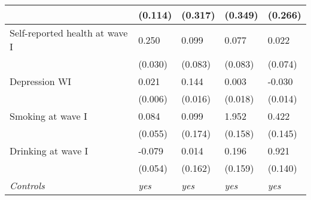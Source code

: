\documentclass[xcolor=dvipsnames]{beamer}
\begin{document}
{\begin{center}
\begin{tiny}
\begin{tabular}{lllll}
                 &     (0.114)         &     (0.317)         &     (0.349)         &     (0.266)         \\
\midrule  
Self-reported health at wave I&       0.250\sym{***}&       0.099         &       0.077         &       0.022         \\
                    &     (0.030)         &     (0.083)         &     (0.083)         &     (0.074)         \\
\addlinespace
Depression WI       &       0.021\sym{***}&       0.144\sym{***}&       0.003         &      -0.030\sym{*}  \\
                    &     (0.006)         &     (0.016)         &     (0.018)         &     (0.014)         \\
\addlinespace
Smoking at wave I   &       0.084         &       0.099         &       1.952\sym{***}&       0.422\sym{**} \\
                    &     (0.055)         &     (0.174)         &     (0.158)         &     (0.145)         \\
\addlinespace
Drinking at wave I  &      -0.079         &       0.014         &       0.196         &       0.921\sym{***}\\
                    &     (0.054)         &     (0.162)         &     (0.159)         &     (0.140)         \\
\emph{Controls}            &  \emph{yes}     &      \emph{yes}       &    \emph{yes}         &     \emph{yes}         \\
\bottomrule

\end{tabular}
		\end{tiny}
	\end{center}
		}
		
\end{document}
